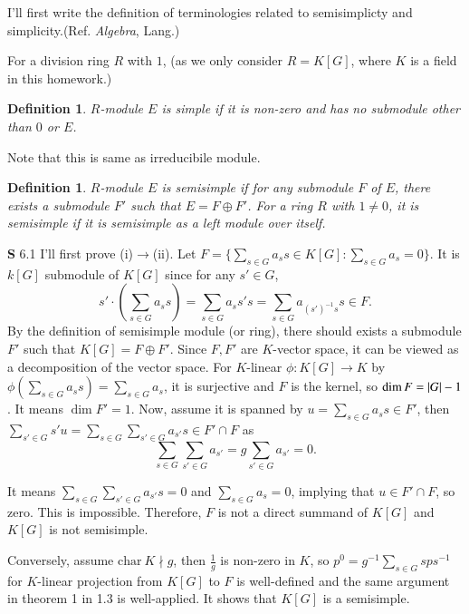 \documentclass[a4paper, 12pt]{article}
\theoremstyle{Mydefinition}
\newtheorem{definition}[statement]{Definition}
\theoremstyle{Mytheorem}
\begin{document}
I'll first write the definition of terminologies related to semisimplicty and simplicity.(Ref. \textit{Algebra}, Lang.)

For a division ring $R$ with $1$, (as we only consider $R=K[G]$, where $K$ is a field in this homework.)
\begin{definition}
$R$-module $E$ is simple if it is non-zero and has no submodule other than $0$ or $E$.
\end{definition}
Note that this is same as irreducibile module.
\begin{definition}
$R$-module $E$ is semisimple if for any submodule $F$ of $E$, there exists a submodule $F'$ such that $E=F\oplus F'$. For a ring $R$ with $1\neq 0$, it is semisimple if it is semisimple as a left module over itself.
\end{definition}

\noindent \textbf{S} 6.1
I'll first prove (i)$\rightarrow$(ii). Let $F = \{\sum_{s\in G}a_s s\in K[G]:\sum_{s\in G}a_s = 0\}$. It is $k[G]$ submodule of $K[G]$ since for any $s'\in G$,
\begin{equation}
    s'\cdot \left(\sum_{s\in G}a_s s\right) = \sum_{s\in G}a_s s's = \sum_{s\in G}a_{(s')^{-1}s} s \in F.
\end{equation}
By the definition of semisimple module (or ring), there should exists a submodule $F'$ such that $K[G]=F\oplus F'$. Since $F,F'$ are $K$-vector space, it can be viewed as a decomposition of the vector space. For $K$-linear $\phi:K[G]\rightarrow K$ by $\phi(\sum_{s\in G}a_s s) = \sum_{s\in G}a_s$, it is surjective and $F$ is the kernel, so $\dim F = \abs{G}-1$. It means $\dim F' = 1$. Now, assume it is spanned by $u = \sum_{s\in G}a_s s\in F'$, then $\sum_{s'\in G}s'u = \sum_{s\in G}\sum_{s'\in G}a_{s'} s\in F'\cap F$ as 
\begin{equation}
    \sum_{s\in G}\sum_{s'\in G}a_{s'} = g\sum_{s'\in G}a_{s'} = 0.
\end{equation}

It means $\sum_{s\in G}\sum_{s'\in G}a_{s'} s = 0$ and $\sum_{s\in G}a_{s} = 0$, implying that $u\in F'\cap F$, so zero. This is impossible. Therefore, $F$ is not a direct summand of $K[G]$ and $K[G]$ is not semisimple.

Conversely, assume $\mathrm{char}~K\nmid g$, then $\frac{1}{g}$ is non-zero in $K$, so $p^0 = g^{-1}\sum_{s\in G}sps^{-1}$ for $K$-linear projection from $K[G]$ to $F$ is well-defined and the same argument in theorem 1 in 1.3 is well-applied. It shows that $K[G]$ is a semisimple.\\
\end{document}
